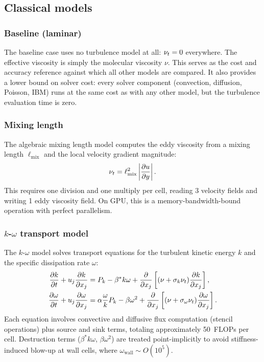 \subsection{Classical models}

\subsubsection{Baseline (laminar)}

The baseline case uses no turbulence model at all: $\nu_t = 0$ everywhere.
The effective viscosity is simply the molecular viscosity $\nu$.
This serves as the cost and accuracy reference against which all other models are compared.
It also provides a lower bound on solver cost: every solver component (convection, diffusion, Poisson, IBM) runs at the same cost as with any other model, but the turbulence evaluation time is zero.

\subsubsection{Mixing length}

The algebraic mixing length model computes the eddy viscosity from a mixing length $\ell_{\mathrm{mix}}$ and the local velocity gradient magnitude:
\begin{equation}
    \nu_t = \ell_{\mathrm{mix}}^2 \left| \frac{\partial u}{\partial y} \right|.
\end{equation}
This requires one division and one multiply per cell, reading 3 velocity fields and writing 1 eddy viscosity field.
On GPU, this is a memory-bandwidth-bound operation with perfect parallelism.

\subsubsection{$k$-$\omega$ transport model}

The $k$-$\omega$ model \citep{Wilcox1988} solves transport equations for the turbulent kinetic energy $k$ and the specific dissipation rate $\omega$:
\begin{align}
    \frac{\partial k}{\partial t} + u_j \frac{\partial k}{\partial x_j} &= P_k - \beta^* k \omega + \frac{\partial}{\partial x_j}\left[(\nu + \sigma_k \nu_t)\frac{\partial k}{\partial x_j}\right], \\
    \frac{\partial \omega}{\partial t} + u_j \frac{\partial \omega}{\partial x_j} &= \alpha \frac{\omega}{k} P_k - \beta \omega^2 + \frac{\partial}{\partial x_j}\left[(\nu + \sigma_\omega \nu_t)\frac{\partial \omega}{\partial x_j}\right].
\end{align}
Each equation involves convective and diffusive flux computation (stencil operations) plus source and sink terms, totaling approximately 50~FLOPs per cell.
Destruction terms ($\beta^* k \omega$, $\beta \omega^2$) are treated point-implicitly to avoid stiffness-induced blow-up at wall cells, where $\omega_{\mathrm{wall}} \sim O(10^5)$.

